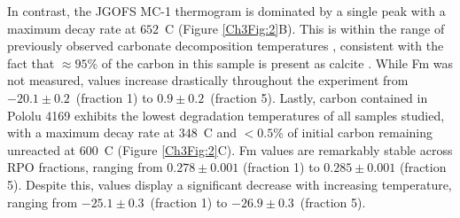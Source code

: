 In contrast, the JGOFS MC-1 thermogram is dominated by a single peak with a maximum decay rate at $652$\textdegree\ C (Figure \ref{Ch3Fig:2}B). This is within the range of previously observed carbonate decomposition temperatures \citep{Plante:2013tu}, consistent with the fact that $\approx 95$\% of the carbon in this sample is present as calcite \citep{Sayles:2001ua}. While Fm was not measured,  values increase drastically throughout the experiment from $-20.1 \pm 0.2$\textperthousand\ (fraction 1) to $0.9 \pm 0.2$\textperthousand\ (fraction 5). Lastly, carbon contained in Pololu 4169 exhibits the lowest degradation temperatures of all samples studied, with a maximum decay rate at $348$\textdegree\ C and $<0.5$\% of initial carbon remaining unreacted at $600$\textdegree\ C (Figure \ref{Ch3Fig:2}C). Fm values are remarkably stable across RPO fractions, ranging from $0.278 \pm 0.001$ (fraction 1) to $0.285 \pm 0.001$ (fraction 5). Despite this,  values display a significant decrease with increasing temperature, ranging from $-25.1 \pm 0.3$\textperthousand\ (fraction 1) to $-26.9 \pm 0.3$\textperthousand\ (fraction 5). 

